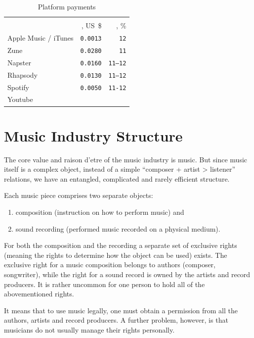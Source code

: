 \documentclass[12pt]{report}
\begin{document}
\begin{table}[H]
\centering
\caption{Platform payments}
\begin{tabular}{lrr}
\toprule
	& \multicolumn{2}{c}{\textbf{\PayPlay}} \\
	\textbf{\Platform} & 
	\textbf{\LabelPartion}, US~\$ &
	\textbf{\ArtistPartion}, \% \\
\bottomrule
\midrule
Apple Music / iTunes		& \texttt{0.0013} 	& \texttt{12} \\
Zune								& \texttt{0.0280} 	& \texttt{11} \\
Napster						& \texttt{0.0160} 	& \texttt{11–12} \\
Rhapsody						& \texttt{0.0130} 	& \texttt{11–12} \\
Spotify							& \texttt{0.0050} 	& \texttt{11-12} \\
Youtube 						& \multicolumn{2}{p{0.55\linewidth}}{\YoutubePay} \\
\bottomrule
\end{tabular}
\end{table}


\section{Music Industry Structure}
\label{industry-structure}
The core value and raison d’etre of the music industry is music. But since music itself is a complex object, instead of a simple “composer + artist > listener” relations, we have an entangled, complicated and rarely efficient structure.

Each music piece comprises two separate objects:
\begin{enumerate}
	\item composition (instruction on how to perform music) and
	\item sound recording (performed music recorded on a physical medium).
\end{enumerate}

For both the composition and the recording a separate set of exclusive rights (meaning the rights to determine how the object can be used) exists. The exclusive right for a music composition belongs to authors (composer, songwriter), while the right for a sound record is owned by the artists and record producers. It is rather uncommon for one person to hold all of the abovementioned rights.

It means that to use music legally, one must obtain a permission from all the authors, artists and record producers. A further problem, however, is that musicians do not usually manage their rights personally.
\end{document}
